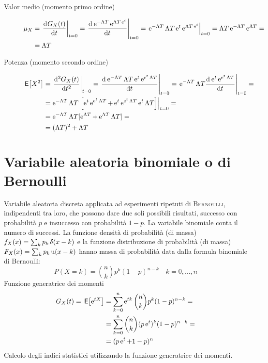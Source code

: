 \begin{description}
\item[Valor medio (momento primo ordine)]
\begin{equation}
\begin{split}
	\mu_X&=\restrict{\deriv{G_X(t)}{t}}{t=0}=\restrict{\deriv{\e{-\Lambda T}\e{\Lambda T\e{t}}}{t}}{t=0}=\restrict{\e{-\Lambda T}{\Lambda T}\e{t}\e{\Lambda T\e{t}}}{t=0}=\Lambda T \e{-\Lambda T}\e{\Lambda T}=\\
	&=\Lambda T
\end{split}
\end{equation}

\item[Potenza (momento secondo ordine)]
\begin{equation}
\begin{split}
	\E{X^2}&=\restrict{\deriv[2]{G_X(t)}{t}}{t=0}=
	\restrict{\deriv{\e{-\Lambda T}{\Lambda T}\e{t}\e{\e{t}\Lambda T}}{t}}{t=0}=
	\restrict{\e{-\Lambda T}{\Lambda T}\deriv{\e{t}\e{\e{t}\Lambda T}}{t}}{t=0}=\\
	&={\e{-\Lambda T}\Lambda T}\restrict{\left[\e{t}\e{\e{t}\Lambda T}+\e{t}\e{\e{t}\Lambda T}{\e{t}\Lambda T}\right]}{t=0}=\\
	&={\e{-\Lambda T}\Lambda T}[\e{\Lambda T}+\e{\Lambda T}{\Lambda T}]=\\
	&=(\Lambda T)^2+\Lambda T
\end{split}
\end{equation}
\end{description}

\section{Variabile aleatoria binomiale o di Bernoulli}
Variabile aleatoria discreta applicata ad esperimenti ripetuti di \textsc{Bernoulli}, indipendenti tra loro, che possono dare due soli possibili risultati, successo con probabilità $p$ e insuccesso con probabilità $1-p$. La variabile binomiale conta il numero di successi.
La funzione densità di probabilità (di massa) $f_X(x)=\sum_k p_k \impulse(x-k)$ e la funzione distribuzione di probabilità (di massa) $F_X(x)=\sum_k p_k \step(x-k)$ hanno massa di probabilità data dalla formula binomiale di Bernoulli:
\begin{equation}
	P(X=k)=\binom{n}{k} p^k (1-p)^{n-k}\quad k=0,\dots,n
\end{equation}
Funzione generatrice dei momenti
\begin{equation}
\begin{split}
	G_X(t)=\E{\e{t X}}&=\sum_{k=0}^{n}{\e{t k}\binom{n}{k}p^k(1-p)^{n-k}}=\\
	&=\sum_{k=0}^{n}{\binom{n}{k}(p\e{t})^k(1-p)^{n-k}}=\\
	&=(p\e{t}+1-p)^n
	\end{split}
\end{equation}
Calcolo degli indici statistici utilizzando la funzione generatrice dei momenti.\\


